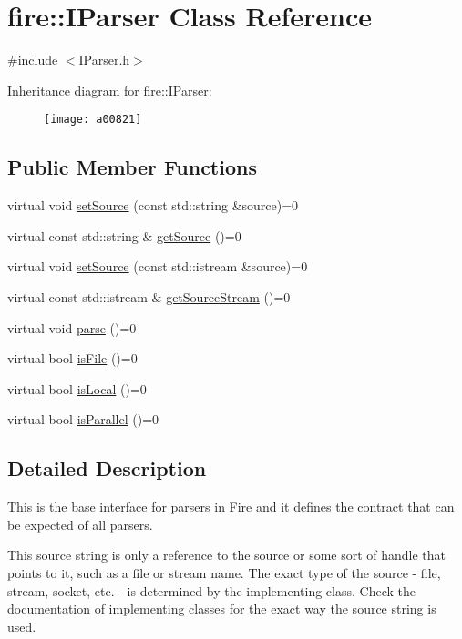 \hypertarget{a00821}{}\section{fire\+:\+:I\+Parser Class Reference}
\label{a00821}


{\ttfamily \#include $<$I\+Parser.\+h$>$}

Inheritance diagram for fire\+:\+:I\+Parser\+:\begin{figure}[H]
\begin{center}
\leavevmode
\texttt{[image: a00821]}
\end{center}
\end{figure}
\subsection*{Public Member Functions}
\begin{DoxyCompactItemize}
\item 
virtual void \hyperlink{a00821_a0dbeff2b9bd8dbfb2aad7a424eef87d1}{set\+Source} (const std\+::string \&source)=0
\item 
virtual const std\+::string \& \hyperlink{a00821_ab55d2644dfa6d950d1f874e1e02df095}{get\+Source} ()=0
\item 
virtual void \hyperlink{a00821_a7748a633910e9bfc27411d6bd840496b}{set\+Source} (const std\+::istream \&source)=0
\item 
virtual const std\+::istream \& \hyperlink{a00821_ac94c7a288bf669322b93ba171c43f90e}{get\+Source\+Stream} ()=0
\item 
virtual void \hyperlink{a00821_af36ac6eedd8c27d2f418869193d7d03c}{parse} ()=0
\item 
virtual bool \hyperlink{a00821_a616c42c85d781c916e97f0ad8f1e9010}{is\+File} ()=0
\item 
virtual bool \hyperlink{a00821_a97b9e58493b3cadbc63e670b0b0e759f}{is\+Local} ()=0
\item 
virtual bool \hyperlink{a00821_a83d2882a466d694fb0aea3d846bcbed4}{is\+Parallel} ()=0
\end{DoxyCompactItemize}


\subsection{Detailed Description}
This is the base interface for parsers in Fire and it defines the contract that can be expected of all parsers.

This source string is only a reference to the source or some sort of handle that points to it, such as a file or stream name. The exact type of the source -\/ file, stream, socket, etc. -\/ is determined by the implementing class. Check the documentation of implementing classes for the exact way the source string is used.

